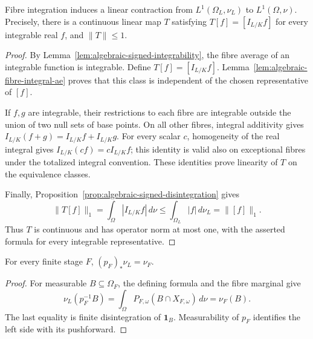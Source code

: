 \begin{corollary}\label{cor:algebraic-L1-operator}
\leanok
{}
Fibre integration induces a linear contraction from
$L^1(\Omega_L,\nu_L)$ to $L^1(\Omega,\nu)$.
Precisely, there is a continuous linear map $T$ satisfying
$T[f]=[I_{L/K}f]$ for every integrable real $f$, and $\|T\|\le1$.
\end{corollary}
\begin{proof}
By Lemma~\ref{lem:algebraic-signed-integrability}, the fibre average of
an integrable function is integrable. Define $T[f]=[I_{L/K}f]$.
Lemma~\ref{lem:algebraic-fibre-integral-ae} proves that this class is
independent of the chosen representative of $[f]$.

If $f,g$ are integrable, their restrictions to each fibre are integrable
outside the union of two null sets of base points. On all other fibres,
integral additivity gives $I_{L/K}(f+g)=I_{L/K}f+I_{L/K}g$.
For every scalar $c$, homogeneity of the real integral gives
$I_{L/K}(cf)=cI_{L/K}f$; this identity is valid also on exceptional
fibres under the totalized integral convention. These identities prove
linearity of $T$ on the equivalence classes.

Finally, Proposition~\ref{prop:algebraic-signed-disintegration} gives
\[
 \|T[f]\|_1=\int_\Omega|I_{L/K}f|\,d\nu
 \le\int_{\Omega_L}|f|\,d\nu_L=\|[f]\|_1.
\]
Thus $T$ is continuous and has operator norm at most one, with the
asserted formula for every integrable representative.
\end{proof}

\begin{lemma}\label{lem:algebraic-measure-marginals}
\leanok
{}
For every finite stage $F$, $(p_F)_*\nu_L=\nu_F$.
\end{lemma}
\begin{proof}
For measurable $B\subseteq\Omega_F$, the defining formula and the
fibre marginal give
\[
 \nu_L(p_F^{-1}B)=\int_\Omega P_{F,\omega}(B\cap X_{F,\omega})\,d\nu
 =\nu_F(B).
\]
The last equality is finite disintegration of $\mathbf1_B$.
Measurability of $p_F$ identifies the left side with its pushforward.
\end{proof}


